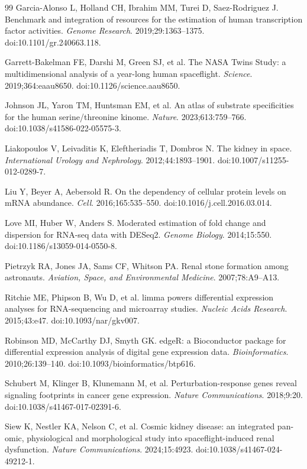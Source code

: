 \documentclass[11pt]{article}
\begin{document}
\begin{thebibliography}{99}
 Garcia-Alonso L, Holland CH, Ibrahim MM, Turei D, Saez-Rodriguez J. Benchmark and integration of resources for the estimation of human transcription factor activities. \emph{Genome Research}. 2019;29:1363--1375. doi:10.1101/gr.240663.118.

 Garrett-Bakelman FE, Darshi M, Green SJ, et al. The NASA Twins Study: a multidimensional analysis of a year-long human spaceflight. \emph{Science}. 2019;364:eaau8650. doi:10.1126/science.aau8650.

 Johnson JL, Yaron TM, Huntsman EM, et al. An atlas of substrate specificities for the human serine/threonine kinome. \emph{Nature}. 2023;613:759--766. doi:10.1038/s41586-022-05575-3.

 Liakopoulos V, Leivaditis K, Eleftheriadis T, Dombros N. The kidney in space. \emph{International Urology and Nephrology}. 2012;44:1893--1901. doi:10.1007/s11255-012-0289-7.

 Liu Y, Beyer A, Aebersold R. On the dependency of cellular protein levels on mRNA abundance. \emph{Cell}. 2016;165:535--550. doi:10.1016/j.cell.2016.03.014.

 Love MI, Huber W, Anders S. Moderated estimation of fold change and dispersion for RNA-seq data with DESeq2. \emph{Genome Biology}. 2014;15:550. doi:10.1186/s13059-014-0550-8.

 Pietrzyk RA, Jones JA, Sams CF, Whitson PA. Renal stone formation among astronauts. \emph{Aviation, Space, and Environmental Medicine}. 2007;78:A9--A13.

 Ritchie ME, Phipson B, Wu D, et al. limma powers differential expression analyses for RNA-sequencing and microarray studies. \emph{Nucleic Acids Research}. 2015;43:e47. doi:10.1093/nar/gkv007.

 Robinson MD, McCarthy DJ, Smyth GK. edgeR: a Bioconductor package for differential expression analysis of digital gene expression data. \emph{Bioinformatics}. 2010;26:139--140. doi:10.1093/bioinformatics/btp616.

 Schubert M, Klinger B, Klunemann M, et al. Perturbation-response genes reveal signaling footprints in cancer gene expression. \emph{Nature Communications}. 2018;9:20. doi:10.1038/s41467-017-02391-6.

 Siew K, Nestler KA, Nelson C, et al. Cosmic kidney disease: an integrated pan-omic, physiological and morphological study into spaceflight-induced renal dysfunction. \emph{Nature Communications}. 2024;15:4923. doi:10.1038/s41467-024-49212-1.


\end{thebibliography}
\end{document}

